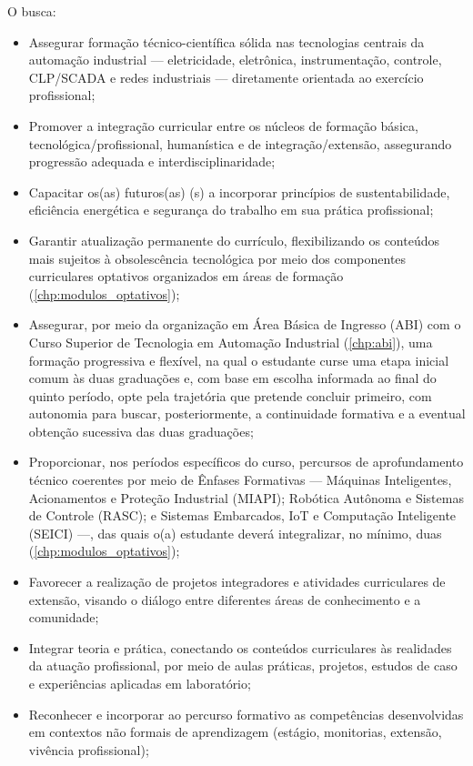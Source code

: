 O \ppccurso busca:

\begin{itemize}
    \item Assegurar formação técnico-científica sólida nas tecnologias centrais da automação industrial — eletricidade, eletrônica, instrumentação, controle, CLP/SCADA e redes industriais — diretamente orientada ao exercício profissional;
    \item Promover a integração curricular entre os núcleos de formação básica, tecnológica/profissional, humanística e de integração/extensão, assegurando progressão adequada e interdisciplinaridade;
    \item Capacitar os(as) futuros(as) \ppctitulacao(s) a incorporar princípios de sustentabilidade, eficiência energética e segurança do trabalho em sua prática profissional;
    \item Garantir atualização permanente do currículo, flexibilizando os conteúdos mais sujeitos à obsolescência tecnológica por meio dos componentes curriculares optativos organizados em áreas de formação (\autoref{chp:modulos_optativos});
    \item Assegurar, por meio da organização em Área Básica de Ingresso (ABI) com o Curso Superior de Tecnologia em Automação Industrial (\autoref{chp:abi}), uma formação progressiva e flexível, na qual o estudante curse uma etapa inicial comum às duas graduações e, com base em escolha informada ao final do quinto período, opte pela trajetória que pretende concluir primeiro, com autonomia para buscar, posteriormente, a continuidade formativa e a eventual obtenção sucessiva das duas graduações;
    \item Proporcionar, nos períodos específicos do curso, percursos de aprofundamento técnico coerentes por meio de Ênfases Formativas — Máquinas Inteligentes, Acionamentos e Proteção Industrial (MIAPI); Robótica Autônoma e Sistemas de Controle (RASC); e Sistemas Embarcados, IoT e Computação Inteligente (SEICI) —, das quais o(a) estudante deverá integralizar, no mínimo, duas (\autoref{chp:modulos_optativos});
    \item Favorecer a realização de projetos integradores e atividades curriculares de extensão, visando o diálogo entre diferentes áreas de conhecimento e a comunidade;
    \item Integrar teoria e prática, conectando os conteúdos curriculares às realidades da atuação profissional, por meio de aulas práticas, projetos, estudos de caso e experiências aplicadas em laboratório;
    \item Reconhecer e incorporar ao percurso formativo as competências desenvolvidas em contextos não formais de aprendizagem (estágio, monitorias, extensão, vivência profissional);

\end{itemize}
